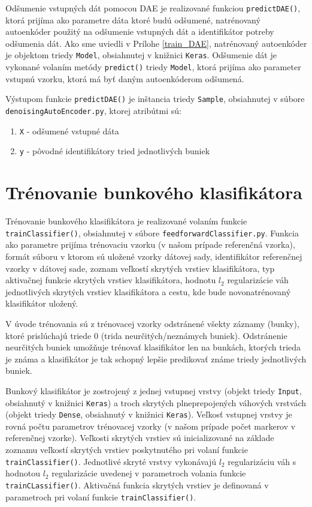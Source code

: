 Odšumenie vstupných dát pomocou DAE je realizované funkciou \texttt{predictDAE()}, ktorá prijíma ako parametre dáta ktoré budú odšumené, natrénovaný autoenkóder použitý na odšumenie vstupných dát a identifikátor potreby odšumenia dát. Ako sme uviedli v Prílohe \ref{train_DAE}, natrénovaný autoenkóder je objektom triedy \texttt{Model}, obsiahnutej v knižnici \texttt{Keras}. Odšumenie dát je vykonané volaním metódy \texttt{predict()} triedy \texttt{Model}, ktorá prijíma ako parameter vstupnú vzorku, ktorá má byť daným autoenkóderom odšumená. 

Výstupom funkcie \texttt{predictDAE()} je inštancia triedy \texttt{Sample}, obsiahnutej v súbore \texttt{denoisingAutoEncoder.py}, ktorej atribútmi sú:
\begin{enumerate}
    \item \texttt{X} - odšumené vstupné dáta
    \item \texttt{y} - pôvodné identifikátory tried jednotlivých buniek
\end{enumerate}

\section{Trénovanie bunkového klasifikátora}
\label{trainFF}

Trénovanie bunkového klasifikátora je realizované volaním funkcie \texttt{trainClassifier()}, obsiahnutej v súbore \texttt{feedforwardClassifier.py}. Funkcia ako parametre prijíma trénovaciu vzorku (v našom prípade referenčná vzorka), formát súboru v ktorom sú uložené vzorky dátovej sady, identifikátor referenčnej vzorky v dátovej sade, zoznam veľkostí skrytých vrstiev klasifikátora, typ aktivačnej funkcie skrytých vrstiev klasifikátora, hodnotu $l_2$ regularizácie váh jednotlivých skrytých vrstiev klasifikátora a cestu, kde bude novonatrénovaný klasifikátor uložený.

V úvode trénovania sú z trénovacej vzorky odstránené všekty záznamy (bunky), ktoré prislúchajú triede $0$ (trida neurčitých/neznámych buniek). Odstránenie neurčitých buniek umožňuje trénovať klasifikátor len na bunkách, ktorých trieda je známa a klasifikátor je tak schopný lepšie predikovať známe triedy jednotlivých buniek. 

Bunkový klasifikátor je zostrojený z jednej vstupnej vrstvy (objekt triedy \texttt{Input}, obsiahnutý v knižnici \texttt{Keras}) a troch skrytých plneprepojených váhových vrstvách (objekt triedy \texttt{Dense}, obsiahnutý v knižnici \texttt{Keras}). Veľkosť vstupnej vrstvy je rovná počtu parametrov trénovacej vzorky (v našom prípade počet markerov v referenčnej vzorke). Veľkosti skrytých vrstiev sú inicializované na základe zoznamu veľkostí skrytých vrstiev poskytnutého pri volaní funkcie \texttt{trainClassifier()}. Jednotlivé skryté vrstvy vykonávajú $l_2$ regularizáciu váh s hodnotou $l_2$ regularizácie uvedenej v parametroch volania funkcie \texttt{trainCLassifier()}. Aktivačná funkcia skrytých vrstiev je definovaná v parametroch pri volaní funkcie \texttt{trainClassifier()}.

